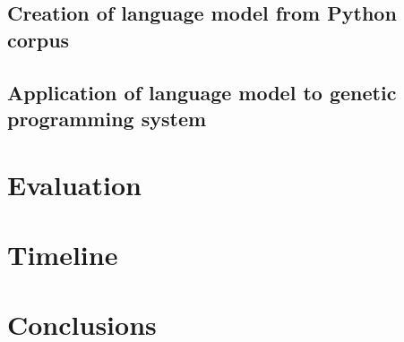 \documentclass[a4paper,11pt]{proposal}
\begin{document}
\subsection{Creation of language model from Python corpus}

\subsection{Application of language model to genetic programming system}

\section{Evaluation}

\section{Timeline}

\section{Conclusions}

\newpage


\end{document}
